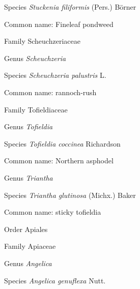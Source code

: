 \documentclass[9pt, article]{memoir}
\begin{document}
\begin{multicols}{2}
\vspace{6pt}\noindent\hspace{36pt}Species \textit{Stuckenia filiformis} (Pers.) Börner


Common name: Fineleaf pondweed

\vspace{6pt}\noindent\hspace{24pt}Family Scheuchzeriaceae


\vspace{6pt}\noindent\hspace{30pt}Genus \textit{Scheuchzeria}


\vspace{6pt}\noindent\hspace{36pt}Species \textit{Scheuchzeria palustris} L.


Common name: rannoch-rush

\vspace{6pt}\noindent\hspace{24pt}Family Tofieldiaceae


\vspace{6pt}\noindent\hspace{30pt}Genus \textit{Tofieldia}


\vspace{6pt}\noindent\hspace{36pt}Species \textit{Tofieldia coccinea} Richardson


Common name: Northern asphodel

\vspace{6pt}\noindent\hspace{30pt}Genus \textit{Triantha}


\vspace{6pt}\noindent\hspace{36pt}Species \textit{Triantha glutinosa} (Michx.) Baker


Common name: sticky tofieldia

\vspace{6pt}\noindent\hspace{18pt}Order Apiales


\vspace{6pt}\noindent\hspace{24pt}Family Apiaceae


\vspace{6pt}\noindent\hspace{30pt}Genus \textit{Angelica}


\vspace{6pt}\noindent\hspace{36pt}Species \textit{Angelica genuflexa} Nutt.



\end{multicols}
\end{document}
